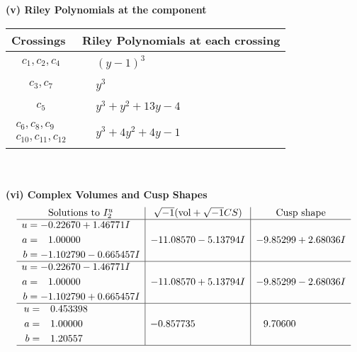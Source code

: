 \documentclass[1p]{elsarticle_modified}
\theoremstyle{definition}
\newcommand{\I}{\sqrt{-1}}
\begin{document}
\flushleft \textbf{(v) Riley Polynomials at the component}\newline \\
\begin{tabular}{m{50pt}|m{274pt}}
Crossings & \hspace{64pt}Riley Polynomials at each crossing \\
\hline $$\begin{aligned}c_{1},c_{2},c_{4}\end{aligned}$$&$\begin{aligned}
&(y-1)^3
\end{aligned}$\\
\hline $$\begin{aligned}c_{3},c_{7}\end{aligned}$$&$\begin{aligned}
&y^3
\end{aligned}$\\
\hline $$\begin{aligned}c_{5}\end{aligned}$$&$\begin{aligned}
&y^3+y^2+13 y-4
\end{aligned}$\\
\hline $$\begin{aligned}c_{6},c_{8},c_{9}\\c_{10},c_{11},c_{12}\end{aligned}$$&$\begin{aligned}
&y^3+4 y^2+4 y-1
\end{aligned}$\\
\hline
\end{tabular}\\~\\
\newpage\flushleft \textbf{(vi) Complex Volumes and Cusp Shapes}
$$\begin{array}{c|c|c}  
\text{Solutions to }I^u_{2}& \I (\text{vol} + \sqrt{-1}CS) & \text{Cusp shape}\\
 \hline 
\begin{aligned}
u &= -0.22670 + 1.46771 I \\
a &= \phantom{-}1.00000\phantom{ +0.000000I} \\
b &= -1.102790 - 0.665457 I\end{aligned}
 & -11.08570 - 5.13794 I & -9.85299 + 2.68036 I \\ \hline\begin{aligned}
u &= -0.22670 - 1.46771 I \\
a &= \phantom{-}1.00000\phantom{ +0.000000I} \\
b &= -1.102790 + 0.665457 I\end{aligned}
 & -11.08570 + 5.13794 I & -9.85299 - 2.68036 I \\ \hline\begin{aligned}
u &= \phantom{-}0.453398\phantom{ +0.000000I} \\
a &= \phantom{-}1.00000\phantom{ +0.000000I} \\
b &= \phantom{-}1.20557\phantom{ +0.000000I}\end{aligned}
 & -0.857735\phantom{ +0.000000I} & \phantom{-}9.70600\phantom{ +0.000000I}\\
 \hline 
 \end{array}$$\newpage\newpage\renewcommand{\arraystretch}{1}
\end{document}
